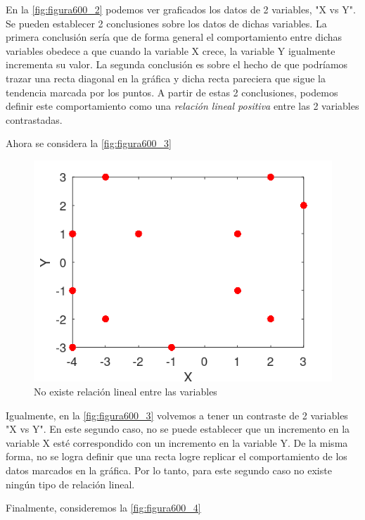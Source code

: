 En la \autoref{fig:figura600_2} podemos ver graficados los datos de 2 variables, "X vs Y". Se pueden establecer 2 conclusiones sobre los datos de dichas variables. La primera conclusión sería que de forma general el comportamiento 
entre dichas variables obedece a que cuando la variable X crece, la variable Y igualmente incrementa su valor. La segunda conclusión es sobre el hecho de que podríamos trazar una recta diagonal en la gráfica y dicha recta 
pareciera que sigue la tendencia marcada por los puntos. A partir de estas 2 conclusiones, podemos definir este comportamiento como una \textit{relación lineal positiva} entre las 2 variables contrastadas.

Ahora se considera la \autoref{fig:figura600_3}

\begin{figure}[h]
	\centering
	\includegraphics[scale=0.7]{imgss142.png}
	\caption{No existe relación lineal entre las variables}
	\label{fig:figura600_3}
\end{figure}

Igualmente, en la \autoref{fig:figura600_3} volvemos a tener un contraste de 2 variables "X vs Y". En este segundo caso, no se puede establecer que un incremento en la variable X esté correspondido con un incremento en 
la variable Y. De la misma forma, no se logra definir que una recta logre replicar el comportamiento de los datos marcados en la gráfica. Por lo tanto, para este segundo caso no existe ningún tipo de relación lineal.

Finalmente, consideremos la \autoref{fig:figura600_4}

\clearpage

